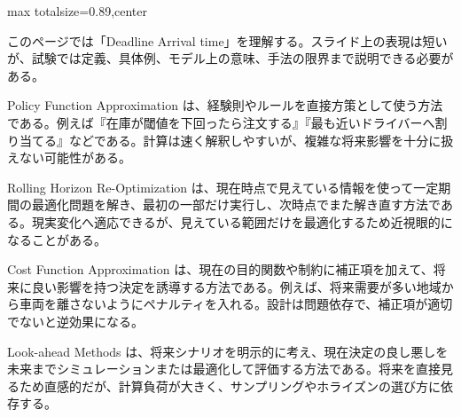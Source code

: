 \begin{minipage}[t]{0.58\textwidth}
\begin{adjustbox}{max totalsize={\textwidth}{0.89\textheight},center}
\begin{minipage}{\textwidth}\scriptsize
{}このページでは「Deadline Arrival time」を理解する。スライド上の表現は短いが、試験では定義、具体例、モデル上の意味、手法の限界まで説明できる必要がある。\par
Policy Function Approximation は、経験則やルールを直接方策として使う方法である。例えば『在庫が閾値を下回ったら注文する』『最も近いドライバーへ割り当てる』などである。計算は速く解釈しやすいが、複雑な将来影響を十分に扱えない可能性がある。\par
Rolling Horizon Re-Optimization は、現在時点で見えている情報を使って一定期間の最適化問題を解き、最初の一部だけ実行し、次時点でまた解き直す方法である。現実変化へ適応できるが、見えている範囲だけを最適化するため近視眼的になることがある。\par
Cost Function Approximation は、現在の目的関数や制約に補正項を加えて、将来に良い影響を持つ決定を誘導する方法である。例えば、将来需要が多い地域から車両を離さないようにペナルティを入れる。設計は問題依存で、補正項が適切でないと逆効果になる。\par
Look-ahead Methods は、将来シナリオを明示的に考え、現在決定の良し悪しを未来までシミュレーションまたは最適化して評価する方法である。将来を直接見るため直感的だが、計算負荷が大きく、サンプリングやホライズンの選び方に依存する。\par

\end{minipage}
\end{adjustbox}
\end{minipage}
